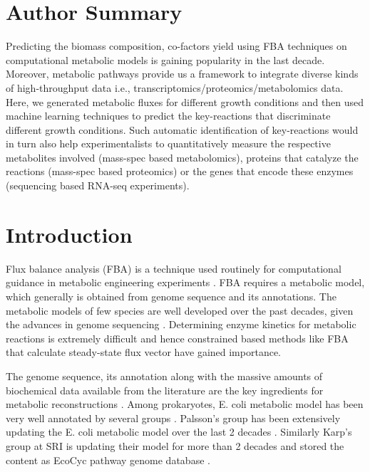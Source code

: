 \documentclass[12pt]{article}
\begin{document}

\section*{Author Summary}
Predicting the biomass composition, co-factors yield using FBA techniques on computational metabolic models is gaining popularity in the last decade. Moreover, metabolic pathways provide us a framework to integrate diverse kinds of high-throughput data i.e., transcriptomics/proteomics/metabolomics data. Here, we generated metabolic fluxes for different growth conditions and then used machine learning techniques to predict the key-reactions that discriminate different growth conditions. Such automatic identification of key-reactions would in turn also help experimentalists to quantitatively measure the respective metabolites involved (mass-spec based metabolomics), proteins that catalyze the reactions (mass-spec based proteomics) or the genes that encode these enzymes (sequencing based RNA-seq experiments).

\section*{Introduction}
Flux balance analysis (FBA) is a technique used routinely for computational guidance in metabolic engineering experiments \cite{Orthetal2010}. FBA requires a metabolic model, which generally is obtained from genome sequence and its annotations. The metabolic models of few species are well developed over the past decades, given the advances in genome sequencing \cite{Schellenbergeretal2010,Caspietal2012}. Determining enzyme kinetics for metabolic reactions is extremely difficult and hence constrained based methods like FBA that calculate steady-state flux vector have gained importance.

\bigskip
\noindent
The genome sequence, its annotation along with the massive amounts of biochemical data available from the literature are the key ingredients for metabolic reconstructions \cite{EdwardsPalsson2000, Karpetal1996, OuzounisKarp2000}. Among prokaryotes, E. coli metabolic model has been very well annotated  by several groups \cite{Karpetal1996,EdwardsPalsson2000}. Palsson's group has been extensively updating the E. coli metabolic model over the last 2 decades \cite{EdwardsPalsson2000,Reedetal2003,Feistetal2007,Orthetal2012}. Similarly Karp's group at SRI is updating their model for more than 2 decades and stored the content as EcoCyc pathway genome database \cite{Keseleretal2013}. 
\end{document}

